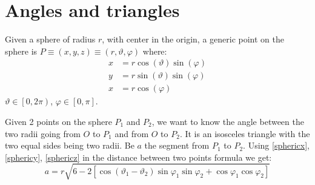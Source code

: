 \appendix
\section{Angles and triangles}
Given a sphere of radius $r$, with center in the origin, a generic point on the sphere is $P \equiv \left( x, y, z \right) \equiv \left( r, \vartheta, \varphi \right)$ where:
\begin{align}
    x & = r \cos\left( \vartheta \right) \sin \left( \varphi \right) \label{sphericx}\\
    y & = r \sin\left( \vartheta \right) \sin \left( \varphi \right) \label{sphericy}\\
    x & = r \cos \left( \varphi \right)  \label{sphericz}
\end{align}
$\vartheta \in \left[0,2\pi\right)$, $\varphi \in \left[0,\pi\right]$.

Given 2 points on the sphere $P_1$ and $P_2$, we want to know the angle between the two radii going from $O$ to $P_1$ and from $O$ to $P_2$.
It is an isosceles triangle with the two equal sides being two radii. Be $a$ the segment from $P_1$ to $P_2$. Using \ref{sphericx}, \ref{sphericy}, \ref{sphericz} in the distance between two points formula we get:
\begin{equation}
    a = r \sqrt{6 - 2 \left[ \cos \left( \vartheta_1 - \vartheta_2 \right) \sin \varphi_1 \sin \varphi_2 + \cos \varphi_1 \cos \varphi_2  \right]} \label{iso_base}
\end{equation}


